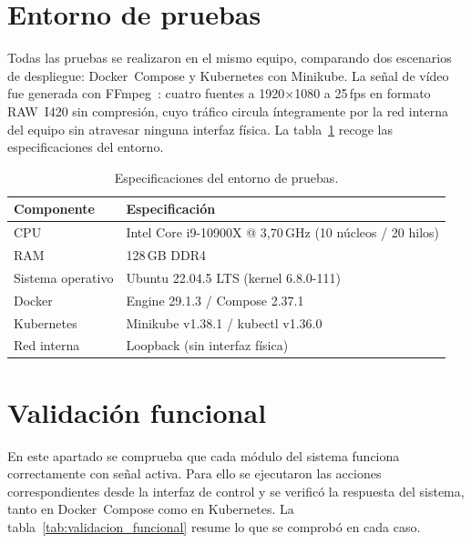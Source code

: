 \section{Entorno de pruebas}
\label{sec:entorno_pruebas}

Todas las pruebas se realizaron en el mismo equipo, comparando dos escenarios de
despliegue: Docker~Compose y Kubernetes con Minikube. La señal de vídeo fue
generada con FFmpeg~\cite{ffmpeg_project}: cuatro fuentes a 1920$\times$1080 a
25\,fps en formato RAW~I420 sin compresión, cuyo tráfico circula íntegramente por
la red interna del equipo sin atravesar ninguna interfaz física. La
tabla~\ref{tab:hardware} recoge las especificaciones del entorno.

\begin{table}[H]
  \centering
  \caption{Especificaciones del entorno de pruebas.}
  \label{tab:hardware}
  \small
  \begin{tabular}{|l|l|}
    \hline
    \textbf{Componente} & \textbf{Especificación} \\
    \hline
    CPU            & Intel Core i9-10900X @ 3{,}70\,GHz (10 núcleos / 20 hilos) \\
    RAM            & 128\,GB DDR4 \\
    Sistema operativo & Ubuntu 22.04.5 LTS (kernel 6.8.0-111) \\
    Docker         & Engine 29.1.3 / Compose 2.37.1 \\
    Kubernetes     & Minikube v1.38.1 / kubectl v1.36.0 \\
    Red interna    & Loopback (sin interfaz física) \\
    \hline
  \end{tabular}
\end{table}

\section{Validación funcional}
\label{sec:validacion_funcional}

En este apartado se comprueba que cada módulo del sistema funciona correctamente
con señal activa. Para ello se ejecutaron las acciones correspondientes desde la
interfaz de control y se verificó la respuesta del sistema, tanto en Docker~Compose
como en Kubernetes. La tabla~\ref{tab:validacion_funcional} resume lo que se
comprobó en cada caso.

